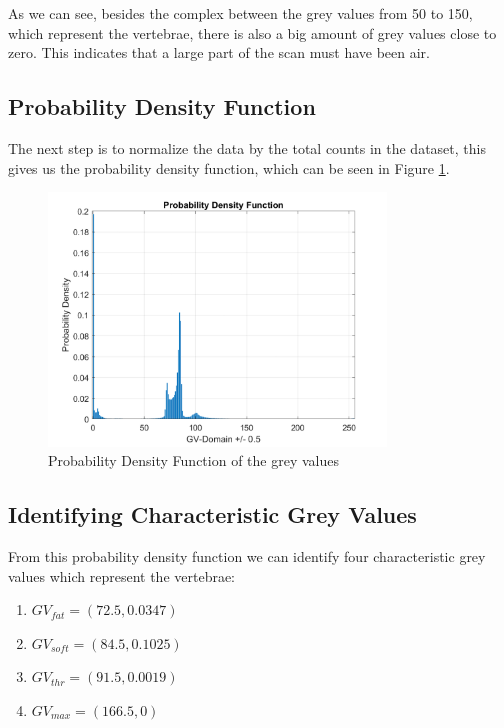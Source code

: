\documentclass[a4paper,12pt]{article}
\begin{document}
    As we can see, besides the complex between the grey values from 50 to 150, which represent the vertebrae, there is also a big amount of grey values close to zero.
    This indicates that a large part of the scan must have been air.

    \subsection{Probability Density Function}\label{subsec:probability-density-function}
    The next step is to normalize the data by the total counts in the dataset, this gives us the probability density function, which can be seen in Figure \ref{fig:PD}.
    \begin{figure}[h]
        \centering
        \includegraphics[width=0.8\textwidth]{PD}
        \caption{Probability Density Function of the grey values}
        \label{fig:PD}
    \end{figure}

    \subsection{Identifying Characteristic Grey Values}\label{subsec:identifying-characteristic-grey-values}
    From this probability density function we can identify four characteristic grey values which represent the vertebrae:
    \begin{enumerate}
        \item $GV_{fat} = (72.5, 0.0347)$
        \item $GV_{soft} = (84.5, 0.1025)$
        \item $GV_{thr} = (91.5, 0.0019)$
        \item $GV_{max} = (166.5, 0)$
    \end{enumerate}
\end{document}
